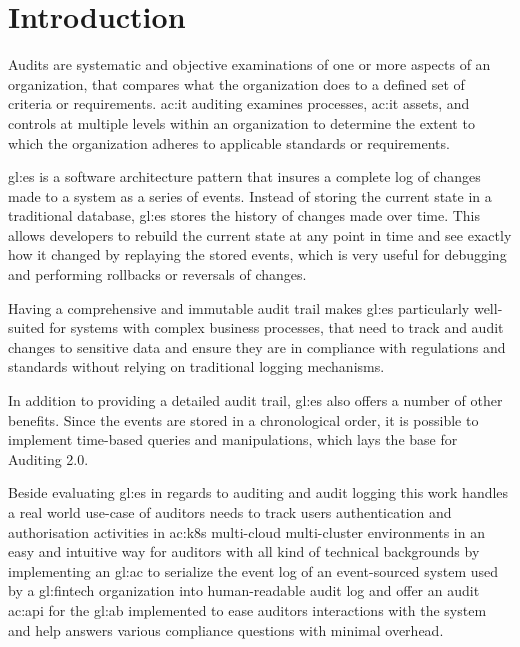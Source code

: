 %
\chapter{Introduction}

Audits are systematic and objective examinations of one or more aspects of an organization, that compares what the organization does to a defined set of criteria or requirements. \gls{ac:it} auditing examines processes, \gls{ac:it} assets, and controls at multiple levels within an organization to determine the extent to which the organization adheres to applicable standards or requirements. 

\gls{gl:es} is a software architecture pattern that insures a complete log of changes made to a system as a series of events. Instead of storing the current state in a traditional database, \gls{gl:es} stores the history of changes made over time. This allows developers to rebuild the current state at any point in time and see exactly how it changed by replaying the stored events, which is very useful for debugging and performing rollbacks or reversals of changes.

Having a comprehensive and immutable audit trail makes \gls{gl:es} particularly well-suited for systems with complex business processes, that need to track and audit changes to sensitive data and ensure they are in compliance with regulations and standards without relying on traditional logging mechanisms.

In addition to providing a detailed audit trail, \gls{gl:es} also offers a number of other benefits. Since the events are stored in a chronological order, it is possible to implement time-based queries and manipulations, which lays the base for Auditing 2.0.

Beside evaluating \gls{gl:es} in regards to auditing and audit logging 
this work handles a real world use-case of auditors needs to track users authentication and authorisation activities in \gls{ac:k8s} multi-cloud multi-cluster environments in an easy and intuitive way for auditors with all kind of technical backgrounds by implementing an \gls{gl:ac} to serialize the event log of an event-sourced system used by a \gls{gl:fintech} organization into human-readable audit log and offer an audit \gls{ac:api} for the \gls{gl:ab} implemented to ease auditors interactions with the system and help answers various compliance questions with minimal overhead.